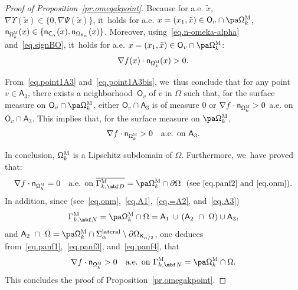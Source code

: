 \begin{proof}[Proof of Proposition~\ref{pr.omegakpoint}]
Because for a.e. $\tilde x$, $\nabla \Upsilon (\tilde x)\in \{0,\nabla \Psi(\tilde x)\}$, it~holds for a.e. $x=(x_1,\tilde x)\in \mathsf O_v\cap \pa \mathsf \Omega_k^{\textsc{M}}$, $\mathsf n_{\mathsf \Omega_k^{\textsc{M}}}(x)\in \{ \mathsf n_{ \mathsf C_\alpha }(x), \mathsf n_{ \Omega_{\mathsf K_\alpha} }(x)\}$.
Moreover, using~\eqref{eq.n-omeka-alpha} and~\eqref{eq.signBO}, it~holds for a.e. $x=(x_1,\tilde x)\in \mathsf O_v\cap \pa \mathsf \Omega_k^{\textsc{M}}$:
\begin{equation}\label{eq.point1A3bis}
\nabla f(x)\cdot \mathsf n_{\mathsf \Omega_k^{\textsc{M}}}(x)>0.
\end{equation}

From~\eqref{eq.point1A3} and~\eqref{eq.point1A3bis}, we~thus conclude
that for any point $v \in \mathsf A_3$, there exists a neighborhood~$\mathsf O_v$ of $v$ in $\Omega$ such that, for the surface measure on $\mathsf O_v\cap \pa \mathsf \Omega_k^{\textsc{M}} $, either $\mathsf O_v \cap \mathsf A_3$ is of measure $0$ or
$\nabla f\cdot \mathsf n_{ \mathsf \Omega_k^{\textsc{M}}}>0$
a.e. on $\mathsf O_v \cap \mathsf A_3$.
This implies that, for the surface measure on $\pa \mathsf \Omega_k^{\textsc{M}} $,
\begin{equation}\label{eq.panf4}
\nabla f\cdot \mathsf n_{ \mathsf \Omega_k^{\textsc{M}}}>0 \quad\text{a.e. on } \mathsf A_3.
\end{equation}

In conclusion, $\mathsf \Omega_k^{\textsc{M}}$ is a Lipschitz subdomain of $\Omega$. Furthermore, we~have proved that:
\[
\nabla f\cdot \mathsf n_{ \mathsf \Omega_k^{\textsc{M}}}=0\quad\text{a.e. on } \overline{\Gamma_{k,\mbf D}^{\textsc{M}} }=\pa \mathsf \Omega_k^{\textsc{M}}\cap \partial \Omega \ \text{ (see~\eqref{eq.panf2} and~\eqref{eq.onm})}.
\]
In addition, since (see~\eqref{eq.onm},~\eqref{eq.A1},~\eqref {eq.=A2}, and~\eqref{eq.A3})
\[
\Gamma_{k,\mbf N}^{\textsc{M}}=\pa \mathsf \Omega_k^{\textsc{M}}\cap \Omega= \mathsf A_1\, \cup\, (\mathsf A_2\ \cap \ \Omega) \cup \mathsf A_3,
\]
and $\mathsf A_2\ \cap \ \Omega=\pa \mathsf \Omega_k^{\textsc{M}}
\cap {\Sigma_\alpha^{\textup{lateral}} }\setminus \partial \Omega_{\mathsf
K_{\alpha/2}} $, one deduces from~\eqref{eq.panf1},~\eqref{eq.panf3}, and~\eqref{eq.panf4}, that
\[
\nabla f\cdot \mathsf n_{ \mathsf \Omega_k^{\textsc{M}}}>0\quad\text{a.e. on } \Gamma_{k,\mbf N}^{\textsc{M}}=\pa \mathsf \Omega_k^{\textsc{M}}\cap \Omega.
\]
This concludes the proof of Proposition~\ref{pr.omegakpoint}.
\end{proof}

